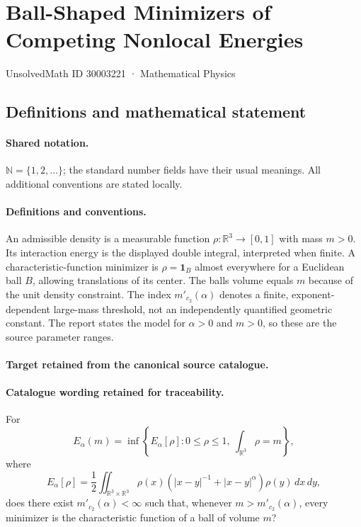 \documentclass[11pt]{article}
\begin{document}
\setcounter{section}{30003220}
\section{Ball-Shaped Minimizers of Competing Nonlocal Energies}\label{30003221}
{\small UnsolvedMath ID 30003221 · Mathematical Physics}
\subsection{Definitions and mathematical statement}

\paragraph{Shared notation.}$\mathbb N=\{1,2,\ldots\}$; the standard number fields have their usual meanings. All additional conventions are stated locally.


\paragraph{Definitions and conventions.}
An admissible density is a measurable function $\rho:\mathbb R^3\to[0,1]$ with mass $m>0$. Its interaction energy is the displayed double integral, interpreted when finite. A characteristic-function minimizer is $\rho=\mathbf1_B$ almost everywhere for a Euclidean ball $B$, allowing translations of its center. The ball\textquotesingle s volume equals $m$ because of the unit density constraint. The index $m'_{c_2}(\alpha)$ denotes a finite, exponent-dependent large-mass threshold, not an independently quantified geometric constant. The report states the model for $\alpha>0$ and $m>0$, so these are the source parameter ranges.

\paragraph{Target retained from the canonical source catalogue.}
\paragraph{Catalogue wording retained for traceability.}
For
$$
E_\alpha(m)=\inf\left\{E_\alpha[\rho]:0\leq\rho\leq1,\ \int_{\mathbb R^3}\rho=m\right\},
$$
where
$$
E_\alpha[\rho]=\frac12\iint_{\mathbb R^3\times\mathbb R^3}\rho(x)\left(|x-y|^{-1}+|x-y|^\alpha\right)\rho(y)\,dx\,dy,
$$
does there exist $m'_{c_2}(\alpha)<\infty$ such that, whenever $m>m'_{c_2}(\alpha)$, every minimizer is the characteristic function of a ball of volume $m$?
\end{document}
